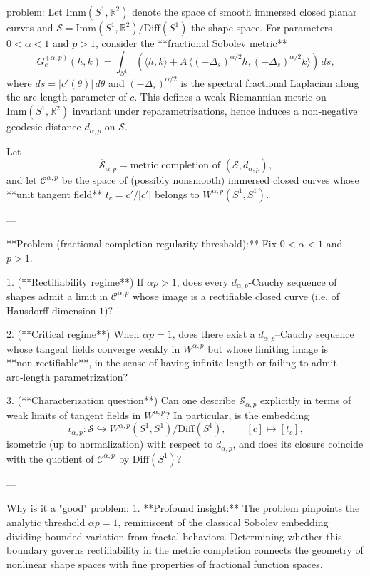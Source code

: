 problem:  
Let $\mathrm{Imm}(S^{1},\mathbb{R}^{2})$ denote the space of smooth immersed closed planar curves and $\mathcal{S}= \mathrm{Imm}(S^{1},\mathbb{R}^{2})/\mathrm{Diff}(S^{1})$ the shape space.  
For parameters \(0<\alpha<1\) and \(p>1\), consider the **fractional Sobolev metric**
\[
G^{(\alpha,p)}_c(h,k)=\int_{S^{1}}\!\!\left(\langle h,k\rangle + A\,\langle (-\Delta_s)^{\alpha/2}h, (-\Delta_s)^{\alpha/2}k\rangle \right)\,ds,
\]
where \(ds=|c'(\theta)|\,d\theta\) and \((-\Delta_s)^{\alpha/2}\) is the spectral fractional Laplacian along the arc‑length parameter of \(c\).  
This defines a weak Riemannian metric on $\mathrm{Imm}(S^1,\mathbb{R}^2)$ invariant under reparametrizations, hence induces a non‑negative geodesic distance \(d_{\alpha,p}\) on \(\mathcal{S}\).

Let
\[
\overline{\mathcal{S}}_{\alpha,p}=\text{metric completion of }(\mathcal{S},d_{\alpha,p}),
\]
and let \(\mathcal{C}^{\alpha,p}\) be the space of (possibly nonsmooth) immersed closed curves whose **unit tangent field**
\(t_c=c'/|c'|\) belongs to \(W^{\alpha,p}(S^1,S^1)\).

---

**Problem (fractional completion regularity threshold):**  
Fix \(0<\alpha<1\) and \(p>1\).  

1. (**Rectifiability regime**)  
   If \(\alpha p>1\), does every \(d_{\alpha,p}\)-Cauchy sequence of shapes admit a limit in \(\mathcal{C}^{\alpha,p}\) whose image is a rectifiable closed curve (i.e. of Hausdorff dimension \(1\))?

2. (**Critical regime**)  
   When \(\alpha p=1\), does there exist a \(d_{\alpha,p}\)–Cauchy sequence whose tangent fields converge weakly in \(W^{\alpha,p}\) but whose limiting image is **non‑rectifiable**, in the sense of having infinite length or failing to admit arc‑length parametrization?

3. (**Characterization question**)  
   Can one describe \(\overline{\mathcal{S}}_{\alpha,p}\) explicitly in terms of weak limits of tangent fields in \(W^{\alpha,p}\)?  
   In particular, is the embedding
   \[
   \iota_{\alpha,p}:\mathcal{S}\hookrightarrow W^{\alpha,p}(S^{1},S^{1})/\mathrm{Diff}(S^{1}),\qquad [c]\mapsto [t_c],
   \]
   isometric (up to normalization) with respect to \(d_{\alpha,p}\), and does its closure coincide with the quotient of \(\mathcal{C}^{\alpha,p}\) by \(\mathrm{Diff}(S^{1})\)?

---

Why is it a "good" problem:  
1. **Profound insight:**  
   The problem pinpoints the analytic threshold $\alpha p=1$, reminiscent of the classical Sobolev embedding dividing bounded‑variation from fractal behaviors.  Determining whether this boundary governs rectifiability in the metric completion connects the geometry of nonlinear shape spaces with fine properties of fractional function spaces.

